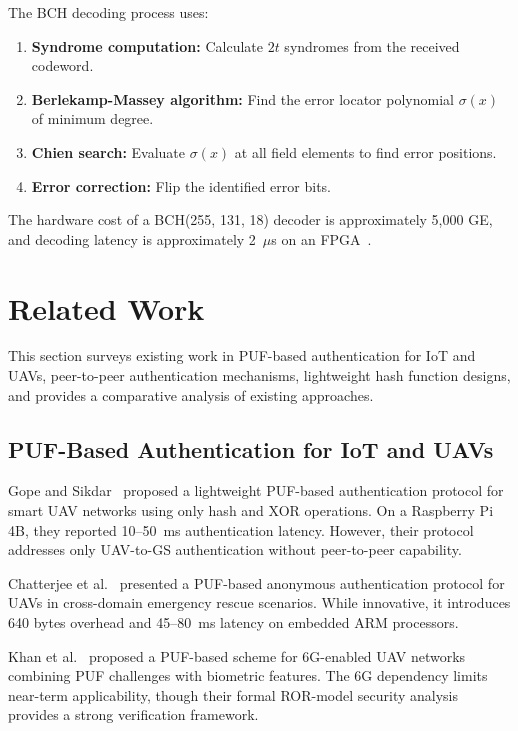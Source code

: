 \documentclass[11pt,a4paper]{article}
\begin{document}
The BCH decoding process uses:
\begin{enumerate}[leftmargin=*]
    \item \textbf{Syndrome computation:} Calculate $2t$ syndromes from the received codeword.
    \item \textbf{Berlekamp-Massey algorithm:} Find the error locator polynomial $\sigma(x)$ of minimum degree.
    \item \textbf{Chien search:} Evaluate $\sigma(x)$ at all field elements to find error positions.
    \item \textbf{Error correction:} Flip the identified error bits.
\end{enumerate}

The hardware cost of a BCH(255, 131, 18) decoder is approximately 5,000 GE, and decoding latency is approximately 2~$\mu$s on an FPGA~\cite{sram_puf_bch}.


\section{Related Work}
\label{sec:related}

This section surveys existing work in PUF-based authentication for IoT and UAVs, peer-to-peer authentication mechanisms, lightweight hash function designs, and provides a comparative analysis of existing approaches.

\subsection{PUF-Based Authentication for IoT and UAVs}

Gope and Sikdar~\cite{puf_lightweight_uav} proposed a lightweight PUF-based authentication protocol for smart UAV networks using only hash and XOR operations. On a Raspberry Pi 4B, they reported 10--50~ms authentication latency. However, their protocol addresses only UAV-to-GS authentication without peer-to-peer capability.

Chatterjee et al.~\cite{puf_uav_cross_domain} presented a PUF-based anonymous authentication protocol for UAVs in cross-domain emergency rescue scenarios. While innovative, it introduces 640 bytes overhead and 45--80~ms latency on embedded ARM processors.

Khan et al.~\cite{puf_6g_uav} proposed a PUF-based scheme for 6G-enabled UAV networks combining PUF challenges with biometric features. The 6G dependency limits near-term applicability, though their formal ROR-model security analysis provides a strong verification framework.
\end{document}
